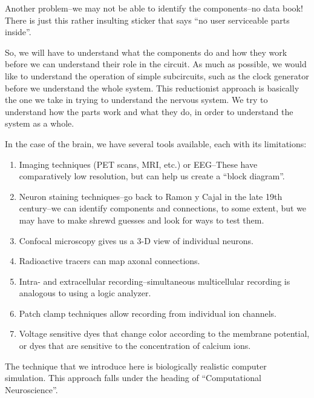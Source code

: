 \documentclass[12pt]{article}
\begin{document}
Another problem--we may not be able to identify the components--no data book! There is just this rather insulting sticker that says ``no user serviceable parts inside''.

So, we will have to understand what the components do and how they work before we can understand their role in the circuit. As much as possible, we would like to understand the operation of simple subcircuits, such as the clock generator before we understand the whole system. This reductionist approach is basically the one we take in trying to understand the nervous system. We try to understand how the parts work and what they do, in order to understand the system as a whole.

In the case of the brain, we have several tools available, each with its limitations:

\begin{enumerate}

\item Imaging techniques (PET scans, MRI, etc.) or EEG--These have comparatively low resolution, but can help us create a ``block diagram''.

\item Neuron staining techniques--go back to Ramon y Cajal in the late 19th century--we can identify components and connections, to some extent, but we may have to make shrewd guesses and look for ways to test them.

\item Confocal microscopy gives us a 3-D view of individual neurons.

\item Radioactive tracers can map axonal connections.
 
\item Intra- and extracellular recording--simultaneous multicellular recording is analogous to using a logic analyzer.

\item Patch clamp techniques allow recording from individual ion channels.
 
\item Voltage sensitive dyes that change color according to the membrane potential, or dyes that are sensitive to the concentration of calcium ions.

\end{enumerate}

The technique that we introduce here is biologically realistic computer simulation. This approach falls under the heading of ``Computational Neuroscience''.
\end{document}
